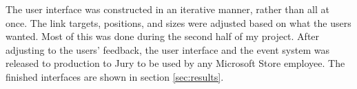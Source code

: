 The user interface was constructed in an iterative manner, rather than all at once. The link targets, positions, and sizes were adjusted based on what the users wanted. Most of this was done during the second half of my project.
After adjusting to the users' feedback, the user interface and the event system was released to production to Jury to be used by any Microsoft Store employee. The finished interfaces are shown in section \ref{sec:results}.

